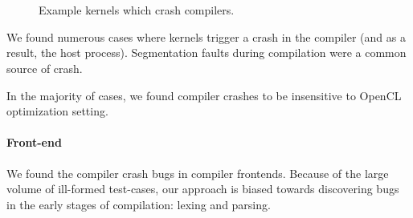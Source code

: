 \begin{figure}
  \centering %
  \\%
  \\%
  \\%
  \\%
  \\%
  \\%
  \\%
  \caption{Example kernels which crash compilers.}%
  \label{lst:compiler-crashes}%
\end{figure}


We found numerous cases where kernels trigger a crash in the compiler (and as a result, the host process). Segmentation faults during compilation were a common source of crash.

In the majority of cases, we found compiler crashes to be insensitive to OpenCL optimization setting.


\paragraph{Front-end} We found the compiler crash bugs in compiler frontends. Because of the large volume of ill-formed test-cases, our approach is biased towards discovering bugs in the early stages of compilation: lexing and parsing.

